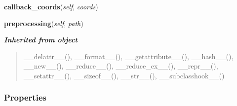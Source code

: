     \label{osm2fbx:osm:module:DataPreprocessor:callback_coords}

    \vspace{0.5ex}

\hspace{.8\funcindent}\begin{boxedminipage}{\funcwidth}

    \raggedright \textbf{callback\_coords}(\textit{self}, \textit{coords})

\setlength{\parskip}{2ex}
\setlength{\parskip}{1ex}
    \end{boxedminipage}

    \label{osm2fbx:osm:module:DataPreprocessor:preprocessing}

    \vspace{0.5ex}

\hspace{.8\funcindent}\begin{boxedminipage}{\funcwidth}

    \raggedright \textbf{preprocessing}(\textit{self}, \textit{path})

\setlength{\parskip}{2ex}
\setlength{\parskip}{1ex}
    \end{boxedminipage}


\large{\textbf{\textit{Inherited from object}}}

\begin{quote}
\_\_delattr\_\_(), \_\_format\_\_(), \_\_getattribute\_\_(), \_\_hash\_\_(), \_\_new\_\_(), \_\_reduce\_\_(), \_\_reduce\_ex\_\_(), \_\_repr\_\_(), \_\_setattr\_\_(), \_\_sizeof\_\_(), \_\_str\_\_(), \_\_subclasshook\_\_()
\end{quote}


  \subsubsection{Properties}


